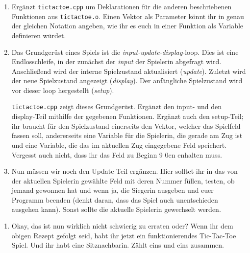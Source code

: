 \begin{praxis}
	\begin{enumerate}
		\item
		      Ergänzt \texttt{tictactoe.cpp} um Deklarationen für die anderen beschriebenen Funktionen aus \texttt{tictactoe.o}.
		      Einen Vektor als Parameter könnt ihr in genau der gleichen Notation angeben, wie ihr es euch in einer Funktion als Variable definieren würdet.
		\item
		      Das Grundgerüst eines Spiels ist die \emph{input-update-display}-loop.
		      Dies ist eine Endlosschleife, in der zunächst der \emph{input} der Spielerin abgefragt wird.
		      Anschließend wird der interne Spielzustand aktualisiert (\emph{update}).
		      Zuletzt wird der neue Spielzustand angezeigt (\emph{display}).
		      Der anfängliche Spielzustand wird vor dieser loop hergestellt (\emph{setup}).

		      \texttt{tictactoe.cpp} zeigt dieses Grundgerüst.
		      Ergänzt den input- und den display-Teil mithilfe der gegebenen Funktionen.
		      Ergänzt auch den setup-Teil; ihr braucht für den Spielzustand einerseits den Vektor, welcher das Spielfeld fassen soll, andererseits eine Variable für die Spielerin, die gerade am Zug ist und eine Variable, die das im aktuellen Zug eingegebene Feld speichert.
		      Vergesst auch nicht, dass ihr das Feld zu Beginn 9 0en enhalten muss.
		\item
		      Nun müssen wir noch den Update-Teil ergänzen.
		      Hier solltet ihr in das von der aktuellen Spielerin gewählte Feld mit deren Nummer füllen, testen, ob jemand gewonnen hat und wenn ja, die Siegerin ausgeben und euer Programm beenden (denkt daran, dass das Spiel auch unentschieden ausgehen kann).
		      Sonst sollte die aktuelle Spielerin gewechselt werden.
	\end{enumerate}
\end{praxis}

\begin{spiel}
	\begin{enumerate}
		\item
		      Okay, das ist nun wirklich nicht schwierig zu erraten oder?
		      Wenn ihr dem obigen Rezept gefolgt seid, habt ihr jetzt ein funktionierendes Tic-Tac-Toe Spiel.
		      Und ihr habt eine Sitznachbarin.
		      Zählt eins und eins zusammen.
	\end{enumerate}
\end{spiel}

